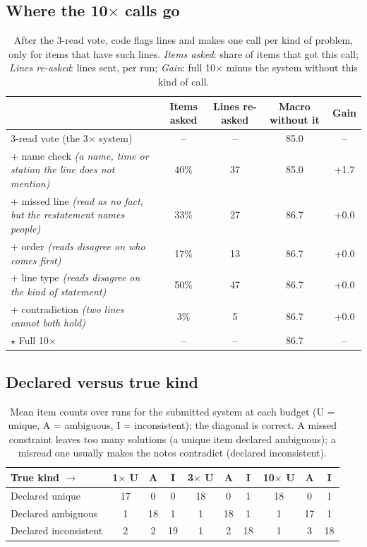 \documentclass[10pt]{article}
\begin{document}
\subsection*{Where the 10$\times$ calls go}
\begin{table}[H]
\centering\footnotesize\setlength{\tabcolsep}{3.5pt}\renewcommand{\arraystretch}{1.08}
\begin{tabular}{@{}l cccc@{}}
\toprule
 & Items asked & Lines re-asked & Macro without it & Gain \\
\midrule
3-read vote (the 3$\times$ system) & -- & -- & 85.0 & -- \\
\quad + name check \textit{\footnotesize (a name, time or station the line does not mention)} & 40\% & 37 & 85.0 & +1.7 \\
\quad + missed line \textit{\footnotesize (read as no fact, but the restatement names people)} & 33\% & 27 & 86.7 & +0.0 \\
\quad + order \textit{\footnotesize (reads disagree on who comes first)} & 17\% & 13 & 86.7 & +0.0 \\
\quad + line type \textit{\footnotesize (reads disagree on the kind of statement)} & 50\% & 47 & 86.7 & +0.0 \\
\quad + contradiction \textit{\footnotesize (two lines cannot both hold)} & 3\% & 5 & 86.7 & +0.0 \\
$\star$ Full 10$\times$ & -- & -- & 86.7 & -- \\
\bottomrule
\end{tabular}
\caption{After the 3-read vote, code flags lines and makes one call per kind of problem, only for items that have such lines. \emph{Items asked}: share of items that got this call; \emph{Lines re-asked}: lines sent, per run; \emph{Gain}: full 10$\times$ minus the system without this kind of call.}
\end{table}

\subsection*{Declared versus true kind}
\begin{table}[H]
\centering\footnotesize\setlength{\tabcolsep}{3.5pt}\renewcommand{\arraystretch}{1.08}
\begin{tabular}{@{}l ccc ccc ccc@{}}
\toprule
True kind $\rightarrow$ & 1$\times$ U & A & I & 3$\times$ U & A & I & 10$\times$ U & A & I \\
\midrule
Declared unique & 17 & 0 & 0 & 18 & 0 & 1 & 18 & 0 & 1 \\
Declared ambiguous & 1 & 18 & 1 & 1 & 18 & 1 & 1 & 17 & 1 \\
Declared inconsistent & 2 & 2 & 19 & 1 & 2 & 18 & 1 & 3 & 18 \\
\bottomrule
\end{tabular}
\caption{Mean item counts over runs for the submitted system at each budget (U = unique, A = ambiguous, I = inconsistent); the diagonal is correct. A missed constraint leaves too many solutions (a unique item declared ambiguous); a misread one usually makes the notes contradict (declared inconsistent).}
\end{table}
\end{document}
